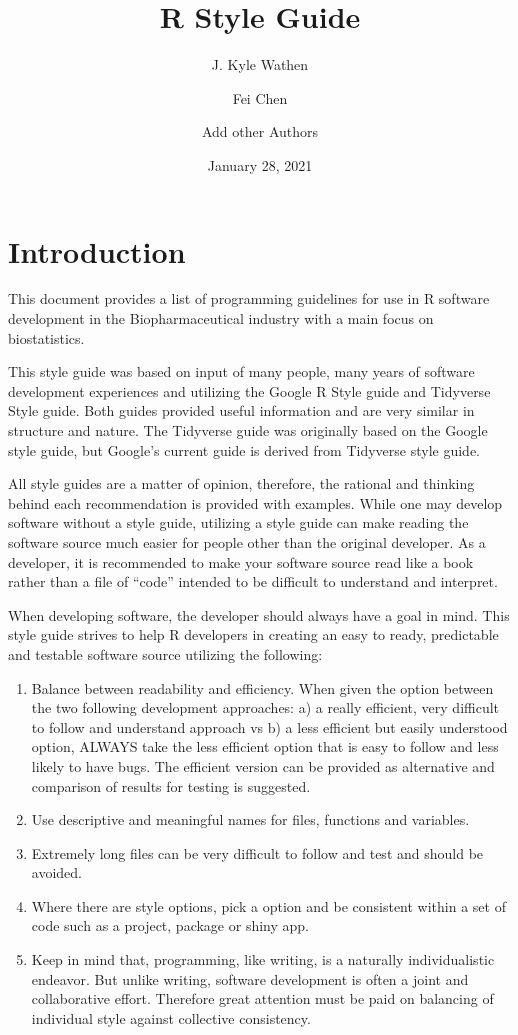 \documentclass[
]{book}
\title{R Style Guide}
\author{J. Kyle Wathen \and Fei Chen \and Add other Authors}
\date{January 28, 2021}
\begin{document}
\maketitle

{
\setcounter{tocdepth}{1}
\tableofcontents
}
\hypertarget{introduction}{%
\chapter{Introduction}\label{introduction}}

This document provides a list of programming guidelines for use in R software development in the Biopharmaceutical industry with a main focus on biostatistics.

This style guide was based on input of many people, many years of software development experiences and utilizing the Google R Style guide and Tidyverse Style guide. Both guides provided useful information and are very similar in structure and nature. The Tidyverse guide was originally based on the Google style guide, but Google's current guide is derived from Tidyverse style guide.

All style guides are a matter of opinion, therefore, the rational and thinking behind each recommendation is provided with examples. While one may develop software without a style guide, utilizing a style guide can make reading the software source much easier for people other than the original developer. As a developer, it is recommended to make your software source read like a book rather than a file of ``code'' intended to be difficult to understand and interpret.

When developing software, the developer should always have a goal in mind. This style guide strives to help R developers in creating an easy to ready, predictable and testable software source utilizing the following:

\begin{enumerate}
\def\labelenumi{\arabic{enumi}.}
\item
  Balance between readability and efficiency. When given the option between the two following development approaches: a) a really efficient, very difficult to follow and understand approach vs b) a less efficient but easily understood option, ALWAYS take the less efficient option that is easy to follow and less likely to have bugs. The efficient version can be provided as alternative and comparison of results for testing is suggested.
\item
  Use descriptive and meaningful names for files, functions and variables.
\item
  Extremely long files can be very difficult to follow and test and should be avoided.
\item
  Where there are style options, pick a option and be consistent within a set of code such as a project, package or shiny app.
\item
  Keep in mind that, programming, like writing, is a naturally
  individualistic endeavor. But unlike writing, software development is
  often a joint and collaborative effort. Therefore great attention must
  be paid on balancing of individual style against collective
  consistency.
\end{enumerate}
\end{document}
